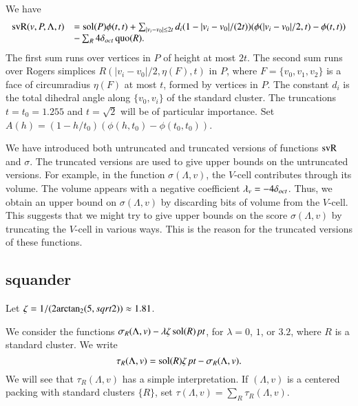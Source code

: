 We have
    \begin{equation}
    \begin{array}{lll}
    \op{svR}(v,P,\Lambda,t) &=
    \sol(P)\phi(t,t)
    +\sum_{|v_i-v_0|\le 2t} d_i (1-|v_i-v_0|/(2t)) (\phi(|v_i-v_0|/2,t)-
    \phi(t,t)) \\
    &-\sum_{R} 4\doct \quo(R).
    \tlabel{eqn:3.7}
    \end{array}
    \end{equation}
The first sum runs over vertices in $P$ of height at most $2t$.
The second sum runs over Rogers simplices $R(|v_i-v_0|/2,\eta(F),t)$
in $P$, where $F=\{v_0,v_1,v_2\}$ is a face of circumradius
$\eta(F)$ at most $t$, formed by vertices in $P$.  The constant
$d_i$ is the total dihedral angle along $\{v_0,v_i\}$ of the
standard cluster. The truncations $t=t_0=1.255$ and $t=\sqrt2$
will be of particular importance.
    Set $A(h) = (1-h/t_0) (\phi(h,t_0)-\phi(t_0,t_0))$.

\begin{remark}  We have introduced both untruncated and truncated
versions of functions ${\operatorname{svR}}$ and $\sigma$.  The truncated versions
are used to give upper bounds on the untruncated versions.  For
example,  in the function $\sigma(\Lambda,v)$, the $V$-cell contributes
through its volume.  The volume
appears with a negative coefficient 
$\lambda_v=-4\delta_{oct}$.  Thus, we obtain an
upper bound on $\sigma(\Lambda,v)$ by discarding bits of volume from the
$V$-cell.   This suggests that we might try to give upper bounds
on the score $\sigma(\Lambda,v)$ by truncating the $V$-cell in various
ways. This is the reason for the truncated versions of these
functions.
\end{remark}




\subsection{squander}%



\begin{definition}[$\zeta$]
Let $\zeta = 1/(2 {\operatorname{arctan_2}}(5,sqrt2))\approx 1.81$.
\end{definition}

We consider the functions
    $\sigma_R(\Lambda,v)-\lambda\zeta\operatorname{sol}(R)\,\hbox{\it pt}$,
for $\lambda=0$, $1$, or $3.2$, where $R$ is a standard cluster.
We write
    $$
    \tau_R(\Lambda,v) = \operatorname{sol}(R)\zeta\,\hbox{\it pt} -
    \sigma_R(\Lambda,v).
    $$
We will see that $\tau_R(\Lambda,v)$ has a simple interpretation.  If $(\Lambda,v)$
is a centered packing with standard clusters $\{R\}$, set $\tau(\Lambda,v)
= \sum_{R}\tau_R(\Lambda,v)$.
\smallskip



